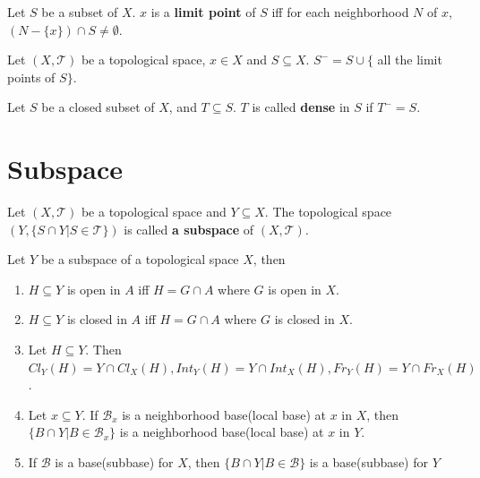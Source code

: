 \documentclass[12pt]{book}
\begin{document}
\begin{definition}
	Let $S$ be a subset of $X$. $x$ is a {\bf limit point} of $S$ iff for each neighborhood $N$ of $x$, $(N-\{x\})\cap S\neq \emptyset$.
\end{definition}

\begin{lemma}
	Let $(X,\mathcal T)$ be a topological space, $x\in X$ and $S\subseteq X$. $S^-=S\cup\{$ all the limit points of $S\}$.
\end{lemma}

\begin{definition}
	Let $S$ be a closed subset of $X$, and $T\subseteq S$. $T$ is called {\bf dense} in $S$ if $T^-=S$.
\end{definition}

\section{Subspace}

\begin{definition}
	Let $(X,\mathcal T)$ be a topological space and $Y\subseteq X$. The topological space $(Y,\{S\cap Y|S\in \mathcal T\})$ is called {\bf a subspace} of $(X,\mathcal T)$.
\end{definition}

\begin{theorem}
	Let $Y$ be a subspace of a topological space $X$, then
	\begin{enumerate}
		\item $H\subseteq Y$ is open in $A$ iff $H=G\cap A$ where $G$ is open in $X$.
		\item $H\subseteq Y$ is closed in $A$ iff $H=G\cap A$ where $G$ is closed in $X$.
		\item Let $H\subseteq Y$. Then $Cl_Y(H)=Y\cap Cl_X(H),Int_Y(H)=Y\cap Int_X(H),Fr_Y(H)=Y\cap Fr_X(H)$.
		\item Let $x\subseteq Y$. If $\mathcal B_x$ is a neighborhood base(local base) at $x$ in $X$, then $\{B\cap Y|B\in\mathcal B_x\}$ is a neighborhood base(local base) at $x$ in $Y$.
		\item If $\mathcal B$ is a base(subbase) for $X$, then $\{B\cap Y|B\in\mathcal B\}$ is a base(subbase) for $Y$
	\end{enumerate}
\end{theorem}
\end{document}
